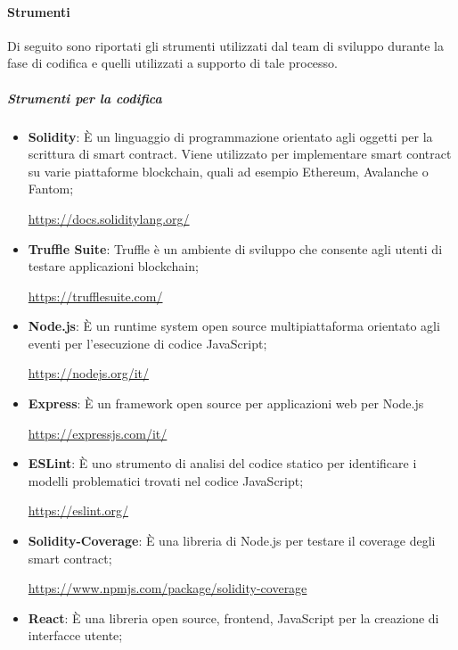 \paragraph{Strumenti}    \label{paragraph:Strumenti}
Di seguito sono riportati gli strumenti utilizzati dal team di sviluppo durante la fase di codifica e quelli utilizzati a supporto di tale processo.
\subparagraph{Strumenti per la codifica}
\begin{itemize}
    \item \textbf{Solidity}: È un linguaggio di programmazione orientato agli oggetti per la scrittura di smart contract\glo{}. Viene utilizzato per implementare smart contract\glo{} su varie piattaforme blockchain\glo{}, quali ad esempio Ethereum\glo{}, Avalanche\glo{} o Fantom\glo{};
          \begin{center}\url{https://docs.soliditylang.org/}\end{center}
    \item \textbf{Truffle Suite}:
          Truffle è un ambiente di sviluppo che consente agli utenti di testare applicazioni blockchain\glo{};
          \begin{center}\url{https://trufflesuite.com/}\end{center}
    \item \textbf{Node.js}: È un runtime system\glo{} open source\glo{} multipiattaforma orientato agli eventi per l'esecuzione di codice JavaScript\glo{};
          \begin{center}\url{https://nodejs.org/it/}\end{center}
    \item \textbf{Express}: È un framework\glo{} open source\glo{} per applicazioni web per Node.js
          \begin{center}\url{https://expressjs.com/it/}\end{center}
    \item \textbf{ESLint}: È uno strumento di analisi del codice statico per identificare i modelli problematici trovati nel codice JavaScript\glo{};
          \begin{center}\url{https://eslint.org/}\end{center}
    \item \textbf{Solidity-Coverage}: È una libreria di Node.js per testare il coverage degli smart contract\glo{};
          \begin{center}\url{https://www.npmjs.com/package/solidity-coverage}\end{center}
    \item \textbf{React}: È una libreria open source\glo{}, frontend\glo{}, JavaScript\glo{} per la creazione di interfacce utente;

\end{itemize}
